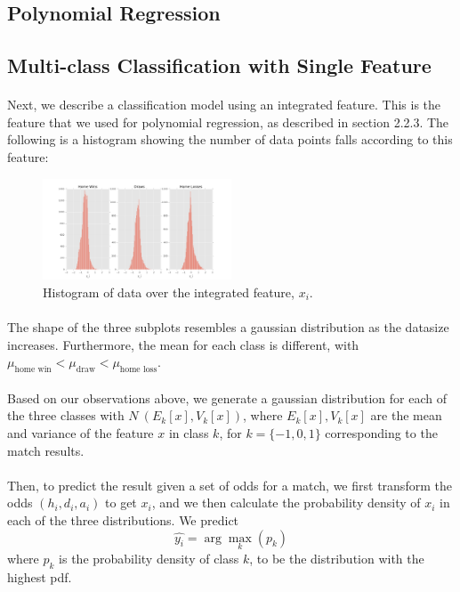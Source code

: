 \documentclass[12pt]{article}
\begin{document}
\subsection{Polynomial Regression}
\subsection{Multi-class Classification with Single Feature}
\paragraph{}
Next, we describe a classification model using an integrated feature. This is the feature that we used for polynomial regression, as described in section 2.2.3. The following is a histogram showing the number of data points falls according to this feature:
\begin{figure}[!ht]
	\centering
	\includegraphics[width=0.5\textwidth]{1D_all.png}
	\caption{Histogram of data over the integrated feature, $x_i$.}
\end{figure}
\paragraph{}
The shape of the three subplots resembles a gaussian distribution as the datasize increases. Furthermore, the mean for each class is different, with $\mu_{\text{home win}} < \mu_{\text{draw}} < \mu_{\text{home loss}}$.
\paragraph{}
Based on our observations above, we generate a gaussian distribution for each of the three classes with $N ~ (E_k[x], V_k[x])$, where $E_k[x], V_k[x]$ are the mean and variance of the feature $x$ in class $k$, for $k = \{-1, 0, 1\}$ corresponding to the match results.
\paragraph{}
Then, to predict the result given a set of odds for a match, we first transform the odds $(h_i, d_i, a_i)$ to get $x_i$, and we then calculate the probability density of $x_i$ in each of the three distributions. We predict \[
\hat{y_i} = \arg\max_k(p_k)
\] where $p_k$ is the probability density of class $k$, to be the distribution with the highest pdf.
\end{document}
